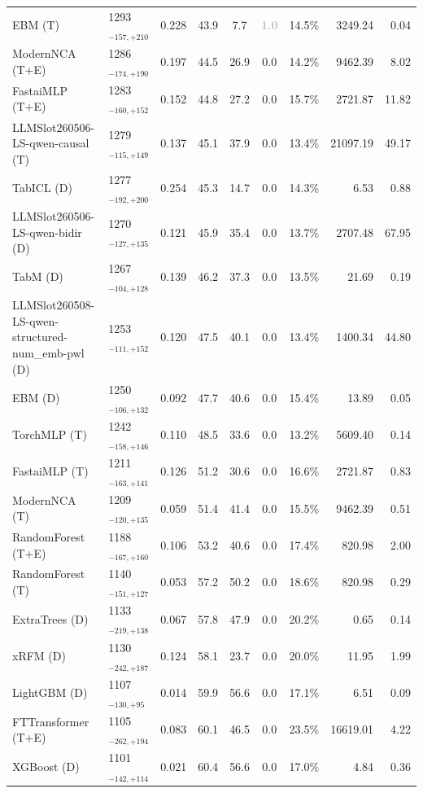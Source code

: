 \begin{tabular}{llcccccrr}
EBM (T) & 1293${}_{-157,+210}$ & 0.228 & 43.9 & 7.7 & \textcolor{silver}{\textbf{1.0}} & 14.5\% & 3249.24 & 0.04 \\
ModernNCA (T+E) & 1286${}_{-174,+190}$ & 0.197 & 44.5 & 26.9 & 0.0 & 14.2\% & 9462.39 & 8.02 \\
FastaiMLP (T+E) & 1283${}_{-160,+152}$ & 0.152 & 44.8 & 27.2 & 0.0 & 15.7\% & 2721.87 & 11.82 \\
LLMSlot260506-LS-qwen-causal (T) & 1279${}_{-115,+149}$ & 0.137 & 45.1 & 37.9 & 0.0 & 13.4\% & 21097.19 & 49.17 \\
TabICL (D) & 1277${}_{-192,+200}$ & 0.254 & 45.3 & 14.7 & 0.0 & 14.3\% & 6.53 & 0.88 \\
LLMSlot260506-LS-qwen-bidir (D) & 1270${}_{-127,+135}$ & 0.121 & 45.9 & 35.4 & 0.0 & 13.7\% & 2707.48 & 67.95 \\
TabM (D) & 1267${}_{-104,+128}$ & 0.139 & 46.2 & 37.3 & 0.0 & 13.5\% & 21.69 & 0.19 \\
LLMSlot260508-LS-qwen-structured-num_emb-pwl (D) & 1253${}_{-111,+152}$ & 0.120 & 47.5 & 40.1 & 0.0 & 13.4\% & 1400.34 & 44.80 \\
EBM (D) & 1250${}_{-106,+132}$ & 0.092 & 47.7 & 40.6 & 0.0 & 15.4\% & 13.89 & 0.05 \\
TorchMLP (T) & 1242${}_{-158,+146}$ & 0.110 & 48.5 & 33.6 & 0.0 & 13.2\% & 5609.40 & 0.14 \\
FastaiMLP (T) & 1211${}_{-163,+141}$ & 0.126 & 51.2 & 30.6 & 0.0 & 16.6\% & 2721.87 & 0.83 \\
ModernNCA (T) & 1209${}_{-120,+135}$ & 0.059 & 51.4 & 41.4 & 0.0 & 15.5\% & 9462.39 & 0.51 \\
RandomForest (T+E) & 1188${}_{-167,+160}$ & 0.106 & 53.2 & 40.6 & 0.0 & 17.4\% & 820.98 & 2.00 \\
RandomForest (T) & 1140${}_{-151,+127}$ & 0.053 & 57.2 & 50.2 & 0.0 & 18.6\% & 820.98 & 0.29 \\
ExtraTrees (D) & 1133${}_{-219,+138}$ & 0.067 & 57.8 & 47.9 & 0.0 & 20.2\% & 0.65 & 0.14 \\
xRFM (D) & 1130${}_{-242,+187}$ & 0.124 & 58.1 & 23.7 & 0.0 & 20.0\% & 11.95 & 1.99 \\
LightGBM (D) & 1107${}_{-130,+95}$ & 0.014 & 59.9 & 56.6 & 0.0 & 17.1\% & 6.51 & 0.09 \\
FTTransformer (T+E) & 1105${}_{-262,+194}$ & 0.083 & 60.1 & 46.5 & 0.0 & 23.5\% & 16619.01 & 4.22 \\
XGBoost (D) & 1101${}_{-142,+114}$ & 0.021 & 60.4 & 56.6 & 0.0 & 17.0\% & 4.84 & 0.36 \\

\end{tabular}
